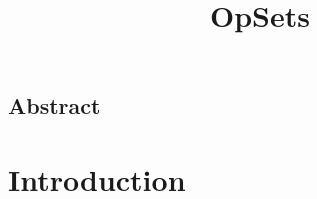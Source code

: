\documentclass[twocolumn,10pt]{article}
\begin{document}
\sloppy
\title{OpSets}
\author{}
\date{}
\maketitle

\subsection*{Abstract}

\section{Introduction}

\cite{Attiya:2016kh}

{\footnotesize

{}}
\end{document}
